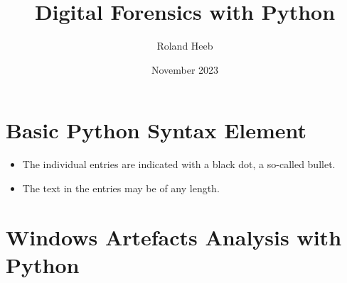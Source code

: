 \documentclass{article}
\title{Digital Forensics with Python}
\author{Roland Heeb}
\date{November 2023}
\begin{document}
\maketitle

\section{Basic Python Syntax Element}
\begin{itemize}
    \item The individual entries are indicated with a black dot, a so-called bullet.
    \item The text in the entries may be of any length.
\end{itemize}


\section{Windows Artefacts Analysis with Python}


\end{document}

